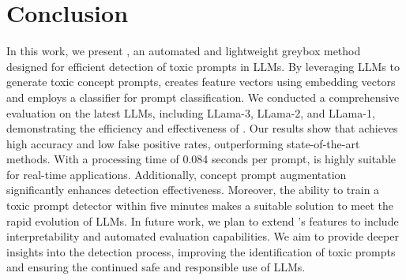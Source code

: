 \vspace{-0.5em}
\section{Conclusion}
\label{sec:conclusion}

In this work, we present \tool{}, an automated and lightweight greybox method designed for efficient detection of toxic prompts in LLMs. By leveraging LLMs to generate toxic concept prompts, \tool{} creates feature vectors using embedding vectors and employs a classifier for prompt classification. We conducted a comprehensive evaluation on the latest LLMs, including LLama-3, LLama-2, and LLama-1, demonstrating the efficiency and effectiveness of \tool{}. Our results show that \tool{} achieves high accuracy and low false positive rates, outperforming state-of-the-art methods. With a processing time of 0.084 seconds per prompt, \tool{} is highly suitable for real-time applications. Additionally, concept prompt augmentation significantly enhances detection effectiveness. Moreover, the ability to train a toxic prompt detector within five minutes makes \tool{} a suitable solution to meet the rapid evolution of LLMs. In future work, we plan to extend \tool{}'s features to include interpretability and automated evaluation capabilities. We aim to provide deeper insights into the detection process, improving the identification of toxic prompts and ensuring the continued safe and responsible use of LLMs.
